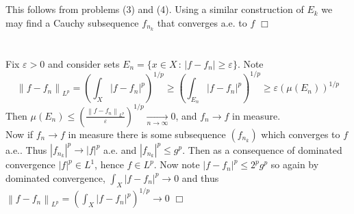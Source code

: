 \documentclass{article}
\newcommand{\norm}[1]{\left\lVert#1\right\rVert}
\begin{document}
\section{}
This follows from problems (3) and (4). Using a similar construction of $E_k$ we may find a Cauchy subsequence $f_{n_k}$ that converges a.e. to $f$ $\Box$

\section{}
Fix $\varepsilon > 0$ and consider sets $E_n = \{ x \in X \,:\, |f-f_n| \geq \varepsilon \}$. Note
$$\norm{f-f_n}_{L^{p}} = \left(\int_X |f-f_n|^p \right)^{1/p} \geq \left(\int_{E_n} |f-f_n|^p \right)^{1/p} \geq \varepsilon\left(\mu(E_n)\right)^{1/p}$$
Then $\mu(E_n) \leq \left(\frac{\norm{f-f_n}_{L^{p}}}{\varepsilon} \right)^{1/p} \xrightarrow[n\rightarrow\infty]{} 0$, and $f_n \rightarrow f$ in measure.\\
Now if $f_n \rightarrow f$ in measure there is some subsequence $(f_{n_k})$ which converges to $f$ a.e.. Thus $|f_{n_k}|^p \rightarrow |f|^p$ a.e. and $|f_{n_k}|^p \leq g^p$. Then as a consequence of dominated convergence $|f|^p \in L^1$, hence $f \in L^p$. Now note $|f-f_n|^p \leq 2^pg^p$ so again by dominated convergence, $\int_X |f-f_n|^p \rightarrow 0$ and thus $\norm{f-f_n}_{L^{p}} = \left(\int_X |f-f_n|^p\right)^{1/p} \rightarrow 0$ $\Box$
\end{document}
